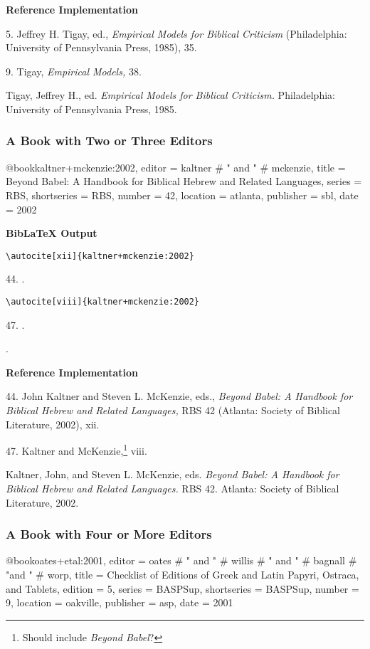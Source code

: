 \documentclass[a4paper]{article}
\newcommand\citetest[5]{%
  {\textbf{BibLaTeX Output}\par
   \nobreak
   \texttt{\textbackslash autocite[#2]\{#5\}}\par
   \color{biblatex-colour}
   #1. \cite[#2]{#5}.\par
   \color{black}
   \texttt{\textbackslash autocite[#4]\{#5\}}\par
   \color{biblatex-colour}
   #3. \cite[#4]{#5}.\par
   \hangindent\bibindent\bibentrycite{#5}.\par}}
\newenvironment{refimp}{%
  \begin{minipage}{\linewidth}
    \setlength{\parskip}{1ex}
    \textbf{Reference Implementation}\par
    \nobreak
    \color{reference-colour}
}{\end{minipage}}
\newenvironment{vb}{%
  \setlength{\parskip}{0pt}
  \verbatim}{\endverbatim}
\begin{document}
\begin{refimp}
  5. Jeffrey H. Tigay, ed., \emph{Empirical Models for Biblical Criticism}
  (Philadelphia: University of Pennsylvania Press, 1985), 35.

  9. Tigay, \emph{Empirical Models,} 38.

  \hangindent\bibindent Tigay, Jeffrey H., ed. \emph{Empirical Models for
  Biblical Criticism.} Philadelphia: University of Pennsylvania Press,
  1985.
\end{refimp}

\subsubsection{A Book with Two or Three Editors}

\begin{vb}
@book{kaltner+mckenzie:2002,
  editor = kaltner # " and " # mckenzie,
  title = {Beyond Babel: A Handbook for Biblical Hebrew and
           Related Languages},
  series = RBS,
  shortseries = {RBS},
  number = {42},
  location = atlanta,
  publisher = sbl,
  date = {2002}
}
\end{vb}  

\citetest{44}{xii}{47}{viii}{kaltner+mckenzie:2002}

\begin{refimp}
  44. John Kaltner and Steven L. McKenzie, eds., \emph{Beyond Babel: A Handbook
  for Biblical Hebrew and Related Languages,} RBS 42 (Atlanta: Society of
  Biblical Literature, 2002), xii.

  47. Kaltner and McKenzie,\footnote{Should include \emph{Beyond Babel}?} viii.

  \hangindent\bibindent Kaltner, John, and Steven L. McKenzie, eds.
  \emph{Beyond Babel: A Handbook for Biblical Hebrew and Related Languages.}
  RBS 42. Atlanta: Society of Biblical Literature, 2002.
\end{refimp}

\subsubsection{A Book with Four or More Editors}

\begin{vb}
@book{oates+etal:2001,
  editor = oates # " and " # willis # " and " # bagnall #
           "and " # worp,
  title = {Checklist of Editions of Greek and Latin Papyri,
           Ostraca, and Tablets},
  edition = {5},
  series = BASPSup,
  shortseries = {BASPSup},
  number = {9},
  location = oakville,
  publisher = asp,
  date = {2001}
}
\end{vb}  
\end{document}
